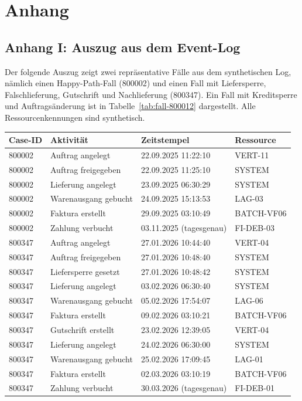 \chapter*{Anhang}


\label{anh:eventlog}
\section*{Anhang I: Auszug aus dem Event-Log}

Der folgende Auszug zeigt zwei repräsentative Fälle aus dem synthetischen Log, nämlich einen Happy-Path-Fall (800002) und einen Fall mit Liefersperre, Falschlieferung, Gutschrift und Nachlieferung (800347). Ein Fall mit Kreditsperre und Auftragsänderung ist in Tabelle~\ref{tab:fall-800012} dargestellt. Alle Ressourcenkennungen sind synthetisch.

{\small
\begin{longtable}{@{}l l l l@{}}
\toprule
\textbf{Case-ID} & \textbf{Aktivität} & \textbf{Zeitstempel} & \textbf{Ressource} \\
\midrule\endhead
800002 & Auftrag angelegt & 22.09.2025 11:22:10 & VERT-11 \\
800002 & Auftrag freigegeben & 22.09.2025 11:25:10 & SYSTEM \\
800002 & Lieferung angelegt & 23.09.2025 06:30:29 & SYSTEM \\
800002 & Warenausgang gebucht & 24.09.2025 15:13:53 & LAG-03 \\
800002 & Faktura erstellt & 29.09.2025 03:10:49 & BATCH-VF06 \\
800002 & Zahlung verbucht & 03.11.2025 (tagesgenau) & FI-DEB-03 \\
800347 & Auftrag angelegt & 27.01.2026 10:44:40 & VERT-04 \\
800347 & Auftrag freigegeben & 27.01.2026 10:48:40 & SYSTEM \\
800347 & Liefersperre gesetzt & 27.01.2026 10:48:42 & SYSTEM \\
800347 & Lieferung angelegt & 03.02.2026 06:30:40 & SYSTEM \\
800347 & Warenausgang gebucht & 05.02.2026 17:54:07 & LAG-06 \\
800347 & Faktura erstellt & 09.02.2026 03:10:21 & BATCH-VF06 \\
800347 & Gutschrift erstellt & 23.02.2026 12:39:05 & VERT-04 \\
800347 & Lieferung angelegt & 24.02.2026 06:30:00 & SYSTEM \\
800347 & Warenausgang gebucht & 25.02.2026 17:09:45 & LAG-01 \\
800347 & Faktura erstellt & 02.03.2026 03:10:19 & BATCH-VF06 \\
800347 & Zahlung verbucht & 30.03.2026 (tagesgenau) & FI-DEB-01 \\
\bottomrule
\end{longtable}}


